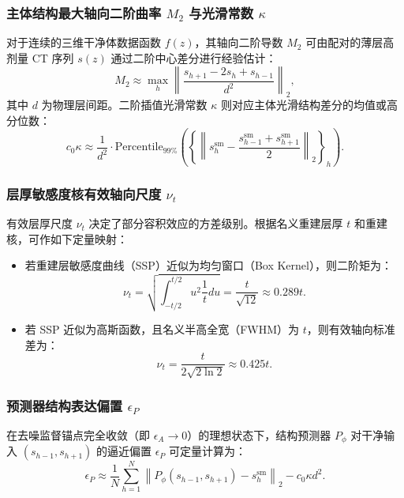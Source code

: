 \documentclass[11pt,a4paper,UTF8,fontset=fandol]{ctexart}
\theoremstyle{definition}
\newcommand{\norm}[1]{\left\lVert#1\right\rVert}
\begin{document}
\subsubsection{主体结构最大轴向二阶曲率 \texorpdfstring{$M_2$}{M2} 与光滑常数 \texorpdfstring{$\kappa$}{kappa}}
对于连续的三维干净体数据函数 $f(z)$，其轴向二阶导数 $M_2$ 可由配对的薄层高剂量 CT 序列 $s(z)$ 通过二阶中心差分进行经验估计：
\begin{equation}
    M_2 \approx \max_{h} \norm{\frac{s_{h+1} - 2s_h + s_{h-1}}{d^2}}_2,
\end{equation}
其中 $d$ 为物理层间距。二阶插值光滑常数 $\kappa$ 则对应主体光滑结构差分的均值或高分位数：
\begin{equation}
    c_0 \kappa \approx \frac{1}{d^2} \cdot \text{Percentile}_{99\%}\left( \left\{ \norm{s_h^{\mathrm{sm}} - \frac{s_{h-1}^{\mathrm{sm}} + s_{h+1}^{\mathrm{sm}}}{2}}_2 \right\}_{h} \right).
\end{equation}

\subsubsection{层厚敏感度核有效轴向尺度 \texorpdfstring{$\nu_t$}{nu-t}}
有效层厚尺度 $\nu_t$ 决定了部分容积效应的方差级别。根据名义重建层厚 $t$ 和重建核，可作如下定量映射：
\begin{itemize}[leftmargin=2em]
    \item 若重建层敏感度曲线（SSP）近似为均匀窗口（Box Kernel），则二阶矩为：
    \begin{equation}
        \nu_t = \sqrt{\int_{-t/2}^{t/2} u^2 \frac{1}{t} du} = \frac{t}{\sqrt{12}} \approx 0.289 t.
    \end{equation}
    \item 若 SSP 近似为高斯函数，且名义半高全宽（FWHM）为 $t$，则有效轴向标准差为：
    \begin{equation}
        \nu_t = \frac{t}{2\sqrt{2\ln 2}} \approx 0.425 t.
    \end{equation}
\end{itemize}

\subsubsection{预测器结构表达偏置 \texorpdfstring{$\epsilon_P$}{epsilon-P}}
在去噪监督锚点完全收敛（即 $\epsilon_A \to 0$）的理想状态下，结构预测器 $P_\phi$ 对干净输入 $(s_{h-1}, \allowbreak s_{h+1})$ 的逼近偏置 $\epsilon_P$ 可定量计算为：
\begin{equation}
    \epsilon_P \approx \frac{1}{N}\sum_{h=1}^N \norm{P_\phi(s_{h-1}, s_{h+1}) - s_h^{\mathrm{sm}}}_2 - c_0 \kappa d^2.
\end{equation}
\end{document}
